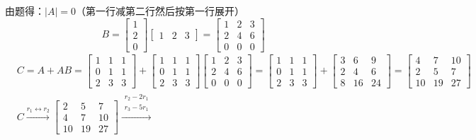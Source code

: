 \documentclass{article}
\begin{document}
\begin{jie}
由题得：$|A|=0$（第一行减第二行然后按第一行展开）
\begin{equation*}
B=\begin{bmatrix}
    1\\ 2\\ 0
  \end{bmatrix}
  \begin{bmatrix}
  1 & 2&3
  \end{bmatrix}
  =\begin{bmatrix}
     1 & 2 & 3\\
2 & 4 & 6\\
0 & 0 & 0
   \end{bmatrix}
\end{equation*}
\begin{align*}
&C=A+AB=
\begin{bmatrix}
  1 & 1 & 1 \\
  0 & 1 & 1 \\
  2 & 3 & 3
\end{bmatrix}+\begin{bmatrix}
  1 & 1 & 1 \\
  0 & 1 & 1 \\
  2 & 3 & 3
\end{bmatrix}\begin{bmatrix}
     1 & 2 & 3\\
2 & 4 & 6\\
0 & 0 & 0
   \end{bmatrix}=\begin{bmatrix}
  1 & 1 & 1 \\
  0 & 1 & 1 \\
  2 & 3 & 3
\end{bmatrix}+\begin{bmatrix}
  3 & 6 & 9 \\
  2 & 4 & 6 \\
  8 & 16 & 24
\end{bmatrix}=
\begin{bmatrix}
  4 & 7 & 10 \\
  2 & 5 & 7 \\
  10 & 19 & 27
\end{bmatrix}
\\
&C\xrightarrow{r_{1}\leftrightarrow r_{2}}
{
\begin{bmatrix}
  2 & 5 & 7\\
  4 & 7 & 10 \\
  10 & 19 & 27
\end{bmatrix}
}\xrightarrow{\substack{r_{2}-2 r_{1}\\r_{3}-5 r_{1}}}

\end{align*}
\end{jie}
\end{document}
